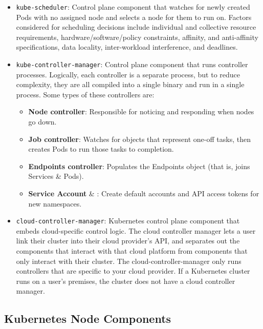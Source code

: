 \begin{itemize}
	\item
	      \texttt{kube-scheduler}: Control plane component that watches for
	      newly created Pods with no assigned node and selects a node for them
	      to run on. Factors considered for scheduling decisions include
	      individual and collective resource requirements,
	      hardware/software/policy constraints, affinity, and anti-affinity
	      specifications, data locality, inter-workload interference, and
	      deadlines.
	\item
	      \texttt{kube-controller-manager}: Control plane component that runs
	      controller processes. Logically, each controller is a separate
	      process, but to reduce complexity, they are all compiled into a single
	      binary and run in a single process. Some types of these controllers
	      are:
	      \begin{itemize}
		      \tightlist
		      \item
		            \textbf{Node controller}: Responsible for noticing and
		            responding when nodes go down.
		      \item
		            \textbf{Job controller}: Watches for  objects that
		            represent one-off tasks, then creates Pods to run those
		            tasks to completion.
		      \item
		            \textbf{Endpoints controller}: Populates the Endpoints
		            object (that is, joins Services \& Pods).
		      \item
		            \textbf{Service Account} \& : Create
		            default accounts and API access tokens for new namespaces.
	      \end{itemize}
	\item
	      \texttt{cloud-controller-manager}: Kubernetes control plane component
	      that embeds cloud-specific control logic. The cloud controller manager
	      lets a user link their cluster into their cloud provider's API, and
	      separates out the components that interact with that cloud platform
	      from components that only interact with their cluster. The
	      cloud-controller-manager only runs controllers that are specific to
	      your cloud provider. If a Kubernetes cluster runs on a user's
	      premises, the cluster does not have a cloud controller manager.
\end{itemize}

\subsection{Kubernetes Node Components}

